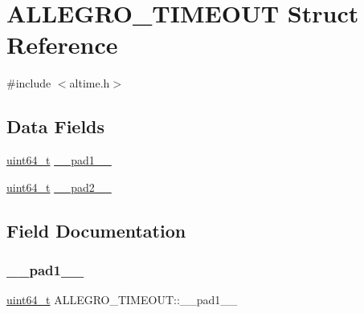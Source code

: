 \hypertarget{struct_a_l_l_e_g_r_o___t_i_m_e_o_u_t}{}\section{A\+L\+L\+E\+G\+R\+O\+\_\+\+T\+I\+M\+E\+O\+UT Struct Reference}
\label{struct_a_l_l_e_g_r_o___t_i_m_e_o_u_t}


{\ttfamily \#include $<$altime.\+h$>$}

\subsection*{Data Fields}
\begin{DoxyCompactItemize}
\item 
\hyperlink{alwatcom_8h_a104204cb123abb831baa5adcfffc64e0}{uint64\+\_\+t} \hyperlink{struct_a_l_l_e_g_r_o___t_i_m_e_o_u_t_a53b36ea8b0d8ce9cfbe4d39394e5567d}{\+\_\+\+\_\+pad1\+\_\+\+\_\+}
\item 
\hyperlink{alwatcom_8h_a104204cb123abb831baa5adcfffc64e0}{uint64\+\_\+t} \hyperlink{struct_a_l_l_e_g_r_o___t_i_m_e_o_u_t_adaad3d2c2c45dc6aba7ef3c748fb0c30}{\+\_\+\+\_\+pad2\+\_\+\+\_\+}
\end{DoxyCompactItemize}


\subsection{Field Documentation}
\mbox{\label{struct_a_l_l_e_g_r_o___t_i_m_e_o_u_t_a53b36ea8b0d8ce9cfbe4d39394e5567d}} 
\subsubsection{\texorpdfstring{\+\_\+\+\_\+pad1\+\_\+\+\_\+}{\_\_pad1\_\_}}
{\footnotesize\ttfamily \hyperlink{alwatcom_8h_a104204cb123abb831baa5adcfffc64e0}{uint64\+\_\+t} A\+L\+L\+E\+G\+R\+O\+\_\+\+T\+I\+M\+E\+O\+U\+T\+::\+\_\+\+\_\+pad1\+\_\+\+\_\+}

\mbox{\label{struct_a_l_l_e_g_r_o___t_i_m_e_o_u_t_adaad3d2c2c45dc6aba7ef3c748fb0c30}} 
